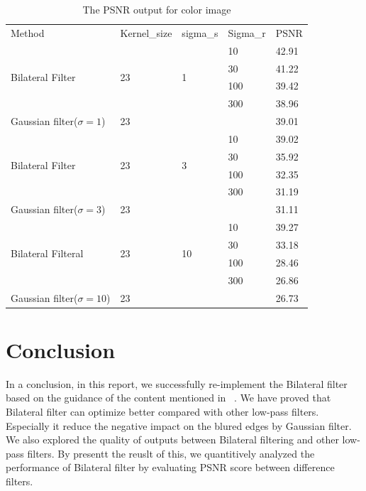\documentclass[12pt]{article}
\begin{document}
\begin{table}[H]
  \centering
  \begin{tabular}{lllll}
  \cline{1-5}
  Method & Kernel\_size & sigma\_s & Sigma\_r & PSNR  \\ \cline{1-1}
  \cline{1-5}
  \multirow{4}{*}{Bilateral Filter}   & \multirow{4}{*}{23} & \multirow{4}{*}{1}                               
                                    & 10      & 42.91 \\
         &             &            & 30      & 41.22     \\
         &             &            & 100     & 39.42     \\
         &             &            & 300     & 38.96     \\
  \cline{1-5}
  Gaussian filter($\sigma = 1$)      & 23 &  & & 39.01     \\
  \cline{1-5}
  \multirow{4}{*}{Bilateral Filter}   & \multirow{4}{*}{23} & \multirow{4}{*}{3}  
                                    & 10       &39.02    \\
        &              &            & 30       &35.92   \\
        &              &            & 100      &32.35    \\
        &              &            & 300      &31.19     \\
  \cline{1-5}     
  Gaussian filter($\sigma = 3$)  & 23 &  & & 31.11 \\
  \cline{1-5}                            
  \multirow{4}{*}{Bilateral Filteral} & \multirow{4}{*}{23} & \multirow{4}{*}{10} 
                                    & 10       & 39.27    \\
       &               &            & 30       & 33.18     \\
       &               &            & 100      & 28.46    \\
       &               &            & 300      & 26.86     \\
  \cline{1-5}
  Gaussian filter($\sigma = 10$)     & 23 &  & & 26.73  \\
  \cline{1-5}  
\end{tabular}
\caption{The PSNR output for color image}
\label{table_PSNR_color}
\end{table}





\section{Conclusion}
\label{section conclusion}
In a conclusion, in this report, we successfully re-implement the Bilateral filter based on the guidance of the content mentioned in ~\cite{paper_gabf}.
We have proved that Bilateral filter can optimize better compared with other low-pass filters. 
Especially it reduce the negative impact on the blured edges by Gaussian filter.
We also explored the quality of outputs between Bilateral filtering and other low-pass filters.
By presentt the reuslt of this, we quantitively analyzed the performance of Bilateral filter by evaluating PSNR score between difference filters.
\end{document}
